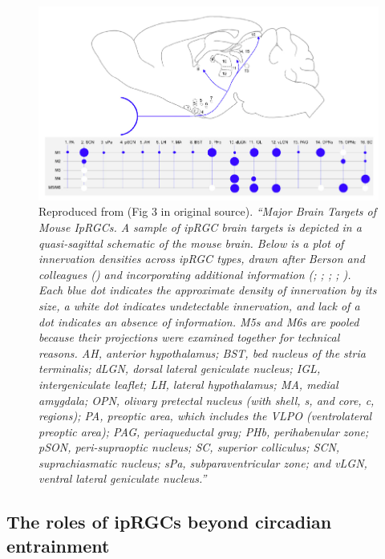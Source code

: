 \begin{figure}[htbp]
\includegraphics[max width=\textwidth, center]{figs/LitRev/projection.png}
\caption{Reproduced from \citet{do_melanopsin_2019} (Fig 3 in original source). \textit{``Major Brain Targets of Mouse IpRGCs. A sample of ipRGC brain targets is depicted in a quasi-sagittal schematic of the mouse brain. Below is a plot of innervation densities across ipRGC types, drawn after Berson and colleagues (\citet{quattrochi_m6_2019}) and incorporating additional information (\citet{ecker_melanopsin-expressing_2010}; \citet{hattar_central_2006}; \citet{huang_visual_2019}; \citet{morin_retinofugal_2014}; \citet{zhao_photoresponse_2014}). Each blue dot indicates the approximate density of innervation by its size, a white dot indicates undetectable innervation, and lack of a dot indicates an absence of information. M5s and M6s are pooled because their projections were examined together for technical reasons. AH, anterior hypothalamus; BST, bed nucleus of the stria terminalis; dLGN, dorsal lateral geniculate nucleus; IGL, intergeniculate leaflet; LH, lateral hypothalamus; MA, medial amygdala; OPN, olivary pretectal nucleus (with shell, s, and core, c, regions); PA, preoptic area, which includes the VLPO (ventrolateral preoptic area); PAG, periaqueductal gray; PHb, perihabenular zone; pSON, peri-supraoptic nucleus; SC, superior colliculus; SCN, suprachiasmatic nucleus; sPa, subparaventricular zone; and vLGN, ventral lateral geniculate nucleus.''}}
\label{fig:projection}
\end{figure}

\subsection{The roles of ipRGCs beyond circadian entrainment}
\label{sec:ipRGCbeyond}

